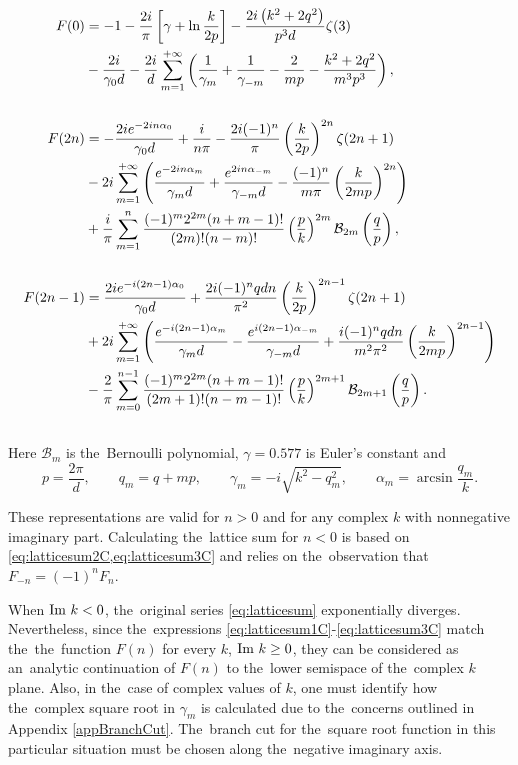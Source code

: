 \begin{align}
\label{eq:latticesum1C}
F(0) &= -1 -\dfrac{2i}{\pi}\left[\gamma+\ln\dfrac{k}{2p}\right]-\dfrac{2i\left(k^2+2q^2\right)}{p^3 d}\zeta(3)\\
&-\dfrac{2i}{\gamma_0 d}-\dfrac{2i}{d}\sum\limits_{m=1}^{+\infty}\left(\dfrac{1}{\gamma_m}+\dfrac{1}{\gamma_{-m}}-\dfrac{2}{mp}-\dfrac{k^2+2q^2}{m^3 p^3}\right),\notag \\ \notag \\
%
\label{eq:latticesum2C}
F(2n) &= -\dfrac{2i e^{-2in\alpha_0}}{\gamma_0 d} +\dfrac{i}{n\pi} -\dfrac{2i(-1)^n}{\pi}\left(\dfrac{k}{2p}\right)^{2n}\zeta(2n+1)\\
&-2i\sum\limits_{m=1}^{+\infty}\left(\dfrac{e^{-2in\alpha_m}}{\gamma_m d}+\dfrac{e^{2in\alpha_{-m}}}{\gamma_{-m} d}-\dfrac{(-1)^n}{m\pi}\left(\dfrac{k}{2mp}\right)^{2n}\right) \notag \\
&+\dfrac{i}{\pi}\sum\limits_{m=1}^{n}\dfrac{(-1)^m 2^{2m}(n+m-1)!}{(2m)!(n-m)!}\left(\dfrac{p}{k}\right)^{2m} \mathcal{B}_{2m}\left(\dfrac{q}{p}\right), \notag \\ \notag \\
%
\label{eq:latticesum3C}
F(2n-1) &= \dfrac{2i e^{-i(2n-1)\alpha_0}}{\gamma_0 d} +\dfrac{2i(-1)^n qdn}{\pi^2}\left(\dfrac{k}{2p}\right)^{2n-1}\zeta(2n+1)\\
&+2i\sum\limits_{m=1}^{+\infty}\left(\dfrac{e^{-i(2n-1)\alpha_m}}{\gamma_m d}-\dfrac{e^{i(2n-1)\alpha_{-m}}}{\gamma_{-m} d}+\dfrac{i(-1)^n qdn}{m^2\pi^2}\left(\dfrac{k}{2mp}\right)^{2n-1}\right) \notag \\
&-\dfrac{2}{\pi}\sum\limits_{m=0}^{n-1}\dfrac{(-1)^m 2^{2m}(n+m-1)!}{(2m+1)!(n-m-1)!}\left(\dfrac{p}{k}\right)^{2m+1} \mathcal{B}_{2m+1}\left(\dfrac{q}{p}\right). \notag \\ \notag
\end{align}
%
%
Here $\mathcal{B}_m$ is the~Bernoulli polynomial, $\gamma=0.577$ is Euler's constant and
\begin{equation}
p=\dfrac{2\pi}{d}, \qquad
q_m=q+mp, \qquad
\gamma_m=-i\sqrt{k^2-q_m^2}, \qquad
\alpha_m=\arcsin\dfrac{q_m}{k}.
\end{equation}

These representations are valid for $n>0$ and for any complex $k$ with nonnegative imaginary part.
Calculating the~lattice sum for $n<0$ is based on \cref{eq:latticesum2C,eq:latticesum3C} and relies on the~observation that $F_{-n} = (-1)^n F_n$.

When $\textrm{Im } k < 0$, the~original series \cref{eq:latticesum} exponentially diverges.
Nevertheless, since the~expressions \cref{eq:latticesum1C}-\cref{eq:latticesum3C} match the~the~function $F(n)$ for every $k$, $\textrm{Im } k \ge 0$, they can be considered as an~analytic continuation of $F(n)$ to the~lower semispace of the~complex $k$ plane.
Also, in the~case of complex values of $k$, one must identify how the~complex square root in $\gamma_m$ is calculated due to the~concerns outlined in Appendix \ref{appBranchCut}.
The~branch cut for the~square root function in this particular situation must be chosen along the~negative imaginary axis.



